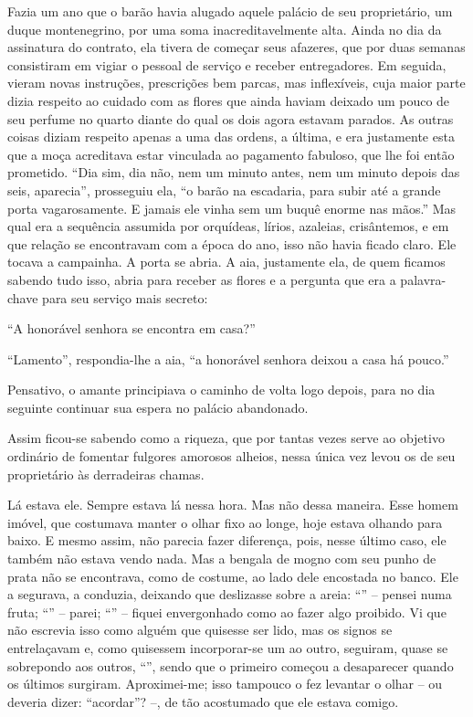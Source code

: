 Fazia um ano que o barão havia alugado aquele palácio de seu
proprietário, um duque montenegrino, por uma soma inacreditavelmente
alta. Ainda no dia da assinatura do contrato, ela tivera de começar seus
afazeres, que por duas semanas consistiram em vigiar o pessoal de
serviço e receber entregadores. Em seguida, vieram novas instruções,
prescrições bem parcas, mas inflexíveis, cuja maior parte dizia respeito
ao cuidado com as flores que ainda haviam deixado um pouco de seu
perfume no quarto diante do qual os dois agora estavam parados. As
outras coisas diziam respeito apenas a uma das ordens, a última, e era
justamente esta que a moça acreditava estar vinculada ao pagamento
fabuloso, que lhe foi então prometido. ``Dia sim, dia não, nem um minuto
antes, nem um minuto depois das seis, aparecia'', prosseguiu ela, ``o
barão na escadaria, para subir até a grande porta vagarosamente. E
jamais ele vinha sem um buquê enorme nas mãos.'' Mas qual era a
sequência assumida por orquídeas, lírios, azaleias, crisântemos, e em
que relação se encontravam com a época do ano, isso não havia ficado
claro. Ele tocava a campainha. A porta se abria. A aia, justamente ela,
de quem ficamos sabendo tudo isso, abria para receber as flores e a
pergunta que era a palavra-chave para seu serviço mais secreto:

``A honorável senhora se encontra em casa?''

``Lamento'', respondia-lhe a aia, ``a honorável senhora deixou a casa há
pouco.''

Pensativo, o amante principiava o caminho de volta logo depois, para no
dia seguinte continuar sua espera no palácio abandonado.

Assim ficou-se sabendo como a riqueza, que por tantas vezes serve ao
objetivo ordinário de fomentar fulgores amorosos alheios, nessa única
vez levou os de seu proprietário às derradeiras chamas.


Lá estava ele. Sempre estava lá nessa hora. Mas não dessa maneira. Esse
homem imóvel, que costumava manter o olhar fixo ao longe, hoje estava
olhando para baixo. E mesmo assim, não parecia fazer diferença, pois,
nesse último caso, ele também não estava vendo nada. Mas a bengala de
mogno com seu punho de prata não se encontrava, como de costume, ao lado
dele encostada no banco. Ele a segurava, a conduzia, deixando que
deslizasse sobre a areia: ``'' -- pensei numa fruta; ``'' -- parei;
``'' -- fiquei envergonhado como ao fazer algo proibido. Vi que não
escrevia isso como alguém que quisesse ser lido, mas os signos se
entrelaçavam e, como quisessem incorporar-se um ao outro, seguiram,
quase se sobrepondo aos outros, ``'', sendo que o primeiro começou a
desaparecer quando os últimos surgiram. Aproximei-me; isso tampouco o
fez levantar o olhar -- ou deveria dizer: ``acordar''? --, de tão
acostumado que ele estava comigo.

